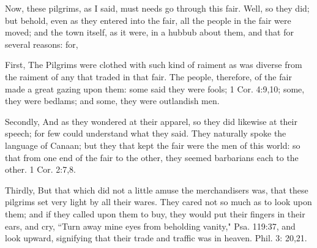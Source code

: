 Now, these pilgrims, as I said, must needs go through this fair. Well, so they did; but behold, even as they entered into the fair, all the people in the fair were moved; and the town itself, as it were, in a hubbub about them, and that for several reasons: for,

First, The Pilgrims were clothed with such kind of raiment as was diverse from the raiment of any that traded in that fair. The people, therefore, of the fair made a great gazing upon them: some said they were fools; 1 Cor. 4:9,10; some, they were bedlams; and some, they were outlandish men.

Secondly, And as they wondered at their apparel, so they did likewise at their speech; for few could understand what they said. They naturally spoke the language of Canaan; but they that kept the fair were the men of this world: so that from one end of the fair to the other, they seemed barbarians each to the other. 1 Cor. 2:7,8.

Thirdly, But that which did not a little amuse the merchandisers was, that these pilgrims set very light by all their wares. They cared not so much as to look upon them; and if they called upon them to buy, they would put their fingers in their ears, and cry, ``Turn away mine eyes from beholding vanity," Psa. 119:37, and look upward, signifying that their trade and traffic was in heaven. Phil. 3: 20,21.

